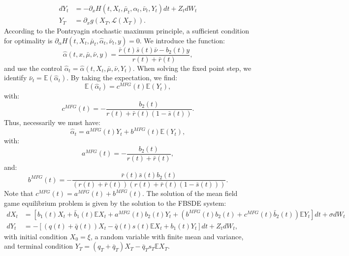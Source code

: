 \documentclass[11pt]{article}
\newcommand\cL{\mathcal L}
\begin{document}
\begin{equation*}
\begin{split}
    dY_t&=- \partial_x H(t,X_t,\bar{\mu}_t,\alpha_t,\bar{\nu}_t,Y_t)dt+Z_tdW_t \\
    Y_T&=\partial_xg(X_T, \cL(X_T)).
\end{split}
\end{equation*}
According to the Pontryagin stochastic maximum principle, a sufficient condition for optimality is $\partial_{\alpha}H(t,X_t,\bar{\mu}_t,\hat{\alpha}_t,\bar{\nu}_t,y)=0$. We introduce the function:
\begin{equation*}
    \hat{\alpha}(t,x,\bar{\mu},\bar{\nu},y)=\frac{\bar{r}(t)\bar{s}(t)\bar{\nu}-b_2(t)y}{r(t)+\bar{r}(t)},
\end{equation*}
and use the control $\hat{\alpha}_t=\hat{\alpha}(t,X_t,\bar{\mu},\bar{\nu},Y_t)$. When solving the fixed point step, we identify $\bar{\nu}_t=\mathbb{E}(\hat{\alpha}_t)$. By taking the expectation, we find:
\begin{equation*}
    \mathbb{E}(\hat{\alpha}_t)=c^{MFG}(t)\mathbb{E}(Y_t),
\end{equation*}
with:
\begin{equation*}
    c^{MFG}(t)=-\frac{b_2(t)}{r(t)+\bar{r}(t)(1-\bar{s}(t))}.
\end{equation*}
Thus, necessarily we must have:
\begin{equation*}
    \hat{\alpha}_t=a^{MFG}(t) Y_t+b^{MFG}(t)\mathbb{E}(Y_t),
\end{equation*}
with:
\begin{equation*}
    a^{MFG}(t)=-\frac{b_2(t)}{r(t)+\bar{r}(t)},
\end{equation*}
and:
\begin{equation*}
    b^{MFG}(t)=-\frac{\bar{r}(t)\bar{s}(t)b_2(t)}{(r(t)+\bar{r}(t))(r(t)+\bar{r}(t)(1-\bar{s}(t)))}.
\end{equation*}
Note that $c^{MFG}(t)=a^{MFG}(t)+b^{MFG}(t)$. The solution of the mean field game equilibrium problem is given by the solution to the FBSDE system:
\begin{equation}
\begin{split}
        dX_t&=\left[b_1(t)X_t+\bar{b}_1(t) \mathbb{E}X_t+a^{MFG}(t)b_2(t)Y_t+(b^{MFG}(t)b_2(t)+c^{MFG}(t)\bar{b}_2(t))\mathbb{E}Y_t\right]dt+\sigma dW_t \\
        dY_t&=-\left[(q(t)+\bar{q}(t))X_t-\bar{q}(t)s(t)\mathbb{E}X_t+b_1(t)Y_t \right]dt +Z_t dW_t,
\end{split}
\label{eq:FBSDE_EMFG}
\end{equation}
with initial condition $X_0=\xi$, a random variable with finite mean and variance, and terminal condition $Y_T=(q_T+\bar{q}_T)X_T-\bar{q}_Ts_T\mathbb{E}X_T$.
\end{document}
